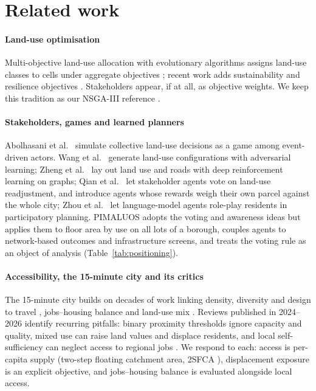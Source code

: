 \documentclass[preprint,12pt]{elsarticle}
\begin{document}
\section{Related work}

\paragraph{Land-use optimisation} Multi-objective land-use allocation with evolutionary algorithms assigns land-use classes to cells under aggregate objectives \cite{stewart2004genetic,cao2011spatial}; recent work adds sustainability and resilience objectives \cite{sicuaio2024sustainable}. Stakeholders appear, if at all, as objective weights. We keep this tradition as our NSGA-III reference \cite{deb2014nsga3,blank2020pymoo}.

\paragraph{Stakeholders, games and learned planners} Abolhasani et al.\ \cite{abolhasani2022collective} simulate collective land-use decisions as a game among event-driven actors. Wang et al.\ \cite{wang2020reimagining} generate land-use configurations with adversarial learning; Zheng et al.\ \cite{zheng2023spatial} lay out land use and roads with deep reinforcement learning on graphs; Qian et al.\ \cite{qian2023aiagent} let stakeholder agents vote on land-use readjustment, and introduce agents whose rewards weigh their own parcel against the whole city; Zhou et al.\ \cite{zhou2024llm} let language-model agents role-play residents in participatory planning. PIMALUOS adopts the voting and awareness ideas but applies them to floor area by use on all lots of a borough, couples agents to network-based outcomes and infrastructure screens, and treats the voting rule as an object of analysis (Table~\ref{tab:positioning}).

\paragraph{Accessibility, the 15-minute city and its critics} The 15-minute city \cite{moreno2021fifteen} builds on decades of work linking density, diversity and design to travel \cite{ewing2010travel}, jobs--housing balance \cite{cervero1989jobs} and land-use mix \cite{song2013comparing}. Reviews published in 2024--2026 identify recurring pitfalls: binary proximity thresholds ignore capacity and quality, mixed use can raise land values and displace residents, and local self-sufficiency can neglect access to regional jobs \cite{mouratidis2024time,mahmoudpour2026critical}. We respond to each: access is per-capita supply (two-step floating catchment area, 2SFCA \cite{luo2003measures}), displacement exposure is an explicit objective, and jobs--housing balance is evaluated alongside local access.
\end{document}
